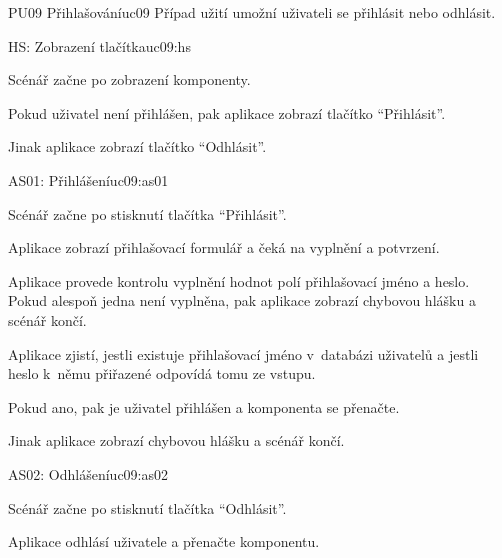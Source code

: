\begin{usecase}{PU09 Přihlašování}{uc09}
    Případ užití umožní uživateli se přihlásit nebo odhlásit.

    \begin{scenario}{HS: Zobrazení tlačítka}{uc09:hs}
        \item Scénář začne po zobrazení komponenty.
        \item Pokud uživatel není přihlášen, pak aplikace zobrazí tlačítko \enquote{Přihlásit}.
        \item Jinak aplikace zobrazí tlačítko \enquote{Odhlásit}.
    \end{scenario}


    \begin{scenario}{AS01: Přihlášení}{uc09:as01}
        \item Scénář začne po stisknutí tlačítka \enquote{Přihlásit}.
        \item Aplikace zobrazí přihlašovací formulář a čeká na vyplnění a potvrzení.
        \item Aplikace provede kontrolu vyplnění hodnot polí přihlašovací jméno a heslo. Pokud alespoň jedna není vyplněna, pak aplikace zobrazí chybovou hlášku a scénář končí.
        \item Aplikace zjistí, jestli existuje přihlašovací jméno v~databázi uživatelů a jestli heslo k~němu přiřazené odpovídá tomu ze vstupu.
        \item Pokud ano, pak je uživatel přihlášen a komponenta se přenačte.
        \item Jinak aplikace zobrazí chybovou hlášku a scénář končí.
    \end{scenario}

    \begin{scenario}{AS02: Odhlášení}{uc09:as02}
        \item Scénář začne po stisknutí tlačítka \enquote{Odhlásit}.
        \item Aplikace odhlásí uživatele a přenačte komponentu.
    \end{scenario}
\end{usecase}